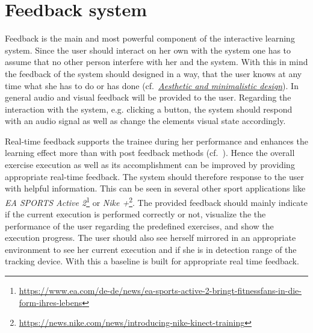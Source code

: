 \section{Feedback system}\label{4_5_feedbackSystem}



Feedback is the main and most powerful component of the interactive learning system. Since the user should interact on her own with the system one has to assume that no other person interfere with her and the system. With this in mind the feedback of the system should designed in a way, that the user knows at any time what she has to do or has done (cf.~\textit{\hyperref[nielsenDesignPrinciples]{Aesthetic and minimalistic design}}). In general audio and visual feedback will be provided to the user. Regarding the interaction with the system, e.g. clicking a button, the system should respond with an audio signal as well as change the elements visual state accordingly.

Real-time feedback supports the trainee during her performance and enhances the learning effect more than with post feedback methods (cf.~\textit{}). Hence the overall exercise execution as well as its accomplishment can be improved by providing appropriate real-time feedback. The system should therefore response to the user with helpful information. This can be seen in several other sport applications like \textit{EA SPORTS Active 2}\footnote{\url{https://www.ea.com/de-de/news/ea-sports-active-2-bringt-fitnessfans-in-die-form-ihres-lebens}} or \textit{Nike +}\footnote{\url{https://news.nike.com/news/introducing-nike-kinect-training}}. The provided feedback should mainly indicate if the current execution is performed correctly or not, visualize the the performance of the user regarding the predefined exercises, and show the execution progress. The user should also see herself mirrored in an appropriate environment to see her current execution and if she is in detection range of the tracking device. With this a baseline is built for appropriate real time feedback.

